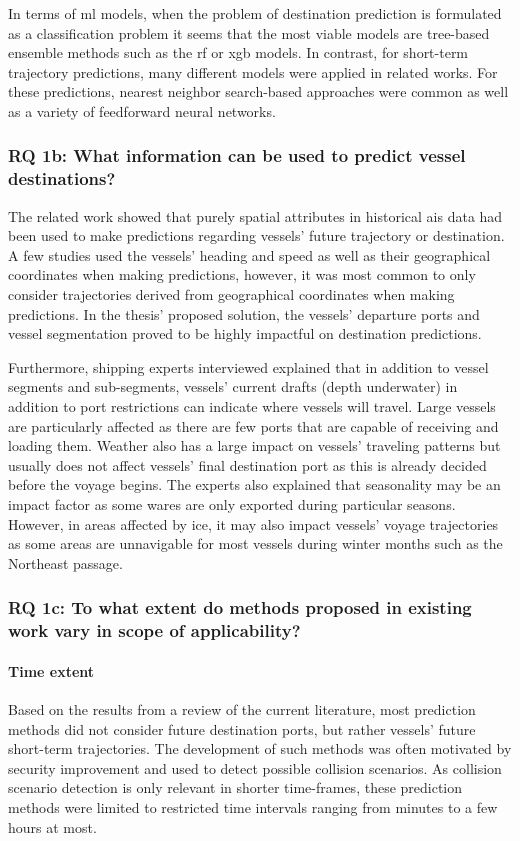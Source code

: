 In terms of \acrshort{ml} models, when the problem of destination prediction is formulated as a classification problem it seems that the most viable models are tree-based ensemble methods such as the \acrfull{rf} or \acrfull{xgb} models. In contrast, for short-term trajectory predictions, many different models were applied in related works. For these predictions, nearest neighbor search-based approaches were common as well as a variety of feedforward neural networks.

\subsubsection{RQ 1b: What information can be used to predict vessel destinations?}

The related work showed that purely spatial attributes in historical \acrshort{ais} data had been used to make predictions regarding vessels' future trajectory or destination. A few studies used the vessels' heading and speed as well as their geographical coordinates when making predictions, however, it was most common to only consider trajectories derived from geographical coordinates when making predictions. In the thesis' proposed solution, the vessels' departure ports and vessel segmentation proved to be highly impactful on destination predictions.

Furthermore, shipping experts interviewed explained that in addition to vessel segments and sub-segments, vessels' current drafts (depth underwater) in addition to port restrictions can indicate where vessels will travel. Large vessels are particularly affected as there are few ports that are capable of receiving and loading them. Weather also has a large impact on vessels' traveling patterns but usually does not affect vessels' final destination port as this is already decided before the voyage begins. The experts also explained that seasonality may be an impact factor as some wares are only exported during particular seasons. However, in areas affected by ice, it may also impact vessels' voyage trajectories as some areas are unnavigable for most vessels during winter months such as the Northeast passage.

\subsubsection{RQ 1c: To what extent do methods proposed in existing work vary in scope of applicability?}

\paragraph{Time extent}
Based on the results from a review of the current literature, most prediction methods did not consider future destination ports, but rather vessels' future short-term trajectories. The development of such methods was often motivated by security improvement and used to detect possible collision scenarios. As collision scenario detection is only relevant in shorter time-frames, these prediction methods were limited to restricted time intervals ranging from minutes to a few hours at most.

